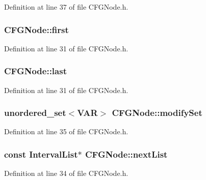 Definition at line 37 of file C\-F\-G\-Node.\-h.

\hypertarget{class_c_f_g_node_a916b31fb1fc28e3a708d3c7913970f66}{
\subsubsection[{first}]{ C\-F\-G\-Node\-::first}}\label{class_c_f_g_node_a916b31fb1fc28e3a708d3c7913970f66}


Definition at line 31 of file C\-F\-G\-Node.\-h.

\hypertarget{class_c_f_g_node_aa2ed16b97347a8daa3ae6a7b0022284b}{
\subsubsection[{last}]{ C\-F\-G\-Node\-::last}}\label{class_c_f_g_node_aa2ed16b97347a8daa3ae6a7b0022284b}


Definition at line 31 of file C\-F\-G\-Node.\-h.

\hypertarget{class_c_f_g_node_a2b140c15b8d43b8af5245731b99d1f2c}{
\subsubsection[{modify\-Set}]{\setlength{\rightskip}{0pt plus 5cm}unordered\-\_\-set$<${\bf V\-A\-R}$>$ C\-F\-G\-Node\-::modify\-Set}}\label{class_c_f_g_node_a2b140c15b8d43b8af5245731b99d1f2c}


Definition at line 35 of file C\-F\-G\-Node.\-h.

\hypertarget{class_c_f_g_node_aa6b60346fb038bfd0c1f1b5d10164fcb}{
\subsubsection[{next\-List}]{\setlength{\rightskip}{0pt plus 5cm}const {\bf Interval\-List}$\ast$ C\-F\-G\-Node\-::next\-List}}\label{class_c_f_g_node_aa6b60346fb038bfd0c1f1b5d10164fcb}


Definition at line 34 of file C\-F\-G\-Node.\-h.

